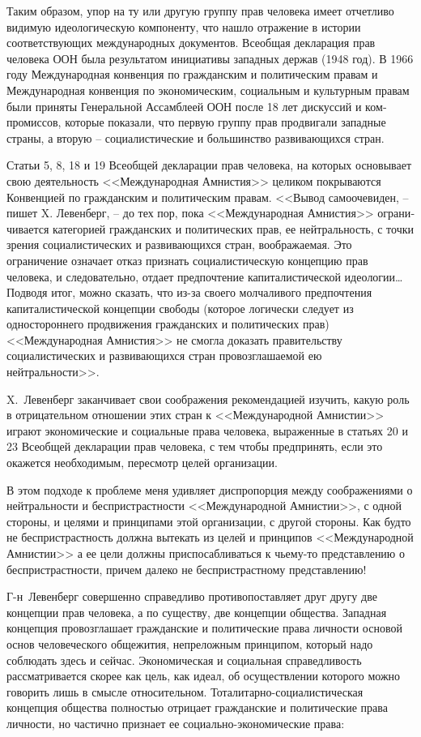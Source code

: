 \documentclass{book}
\begin{document}
Таким образом, упор на ту или другую группу прав чело­века имеет отчетливо видимую идеологическую компоненту, что нашло отражение в истории соответствующих меж\-ду\-на\-род\-ных документов. Всеобщая декларация прав человека ООН была результатом инициативы западных держав (1948 год). В 1966 году Международная конвенция по гражданским и по­литическим правам и Международная конвенция по экономи­ческим, социальным и культурным правам были приняты Ге­неральной Ассамблеей ООН после 18 лет дискуссий и ком­промиссов, которые показали, что первую группу прав про­двигали западные страны, а вторую -- социалистические и боль­шинство развивающихся стран.

Статьи 5, 8, 18 и 19 Всеобщей декларации прав человека, на которых основывает свою деятельность <<Международная Ам­нистия>> целиком покрываются Конвенцией по гражданским и политическим правам. <<Вывод самоочевиден, -- пишет X. Левенберг, -- до тех пор, пока <<Международная Амнистия>> ограни­чивается категорией гражданских и политических прав, ее нейтральность, с точки зрения социалистических и развива­ющихся стран, воображаемая. Это ограничение означает от­каз признать социалистическую концепцию прав человека, и следовательно, отдает предпочтение капиталистической идео­логии\ldots Подводя итог, можно сказать, что из-за своего молча­ливого предпочтения капиталистической концепции свободы (которое логически следует из одностороннего продвижения гражданских и политических прав) <<Международная Амнистия>> не смогла доказать правительству социалистических и развива­ющихся стран провозглашаемой ею нейтральности>>.

X.~Левенберг заканчивает свои соображения рекоменда­цией изучить, какую роль в отрицательном отношении этих стран к <<Международной Амнистии>> играют экономические и со­циальные права человека, выраженные в статьях 20 и 23 Всеоб­щей декларации прав человека, с тем чтобы предпринять, ес­ли это окажется необходимым, пересмотр целей организации.

В этом подходе к проблеме меня удивляет диспропорция между соображениями о нейтральности и беспристрастности <<Международной Амнистии>>, с одной стороны, и целями и прин­ципами этой организации, с другой стороны. Как будто не беспристрастность должна вытекать из целей и принципов <<Международной Амнистии>> а ее цели должны приспосабливаться к чьему-то представлению о беспристрастности, причем далеко не беспристрастному представлению!

Г-н~Левенберг совершенно справедливо противопоставляет друг другу две концепции прав человека, а по существу, две концепции общества. Западная концепция провозглашает граж­данские и политические права личности основой основ чело­веческого общежития, непреложным принципом, который на­до соблюдать здесь и сейчас. Экономическая и социальная спра­ведливость рассматривается скорее как цель, как идеал, об осуществлении которого можно говорить лишь в смысле отно­сительном. Тоталитарно-социалистическая концепция общества полностью отрицает гражданские и политические права лично­сти, но частично признает ее социально-экономические права:
\end{document}
